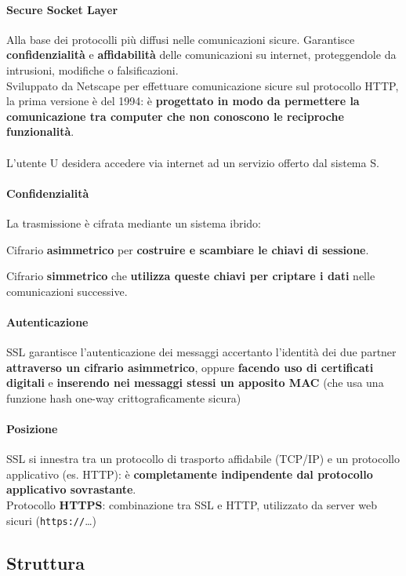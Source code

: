 \documentclass[10pt]{book}
\begin{document}
\paragraph{Secure Socket Layer} Alla base dei protocolli più diffusi nelle comunicazioni sicure. Garantisce \textbf{confidenzialità} e \textbf{affidabilità} delle comunicazioni su internet, proteggendole da intrusioni, modifiche o falsificazioni.\\
Sviluppato da Netscape per effettuare comunicazione sicure sul protocollo HTTP, la prima versione è del 1994: è \textbf{progettato in modo da permettere la comunicazione tra computer che non conoscono le reciproche funzionalità}.\\\\
L'utente U desidera accedere via internet ad un servizio offerto dal sistema S.
\paragraph{Confidenzialità} La trasmissione è cifrata mediante un sistema ibrido:
\begin{list}{}{}
	\item Cifrario \textbf{asimmetrico} per \textbf{costruire e scambiare le chiavi di sessione}.
	\item Cifrario \textbf{simmetrico} che \textbf{utilizza queste chiavi per criptare i dati} nelle comunicazioni successive.
\end{list}
\paragraph{Autenticazione} SSL garantisce l'autenticazione dei messaggi accertanto l'identità dei due partner \textbf{attraverso un cifrario asimmetrico}, oppure \textbf{facendo uso di certificati digitali} e \textbf{inserendo nei messaggi stessi un apposito MAC} (che usa una funzione hash one-way crittograficamente sicura)
\paragraph{Posizione} SSL si innestra tra un protocollo di trasporto affidabile (TCP/IP) e un protocollo applicativo (es. HTTP): è \textbf{completamente indipendente dal protocollo applicativo sovrastante}.\\
Protocollo \textbf{HTTPS}: combinazione tra SSL e HTTP, utilizzato da server web sicuri (\texttt{https://}\ldots)
\pagebreak
\subsection{Struttura}
\end{document}
